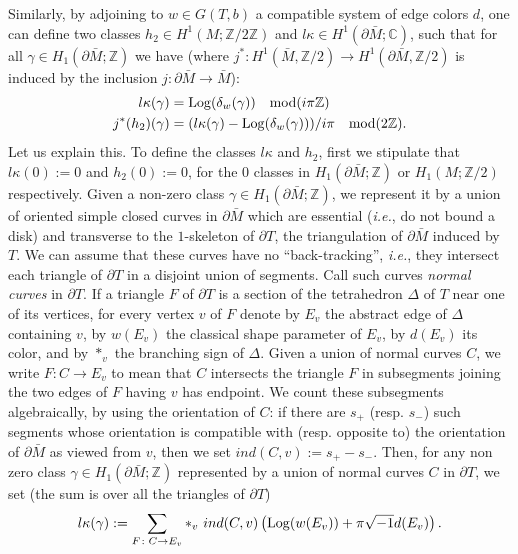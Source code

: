 \documentclass[11pt]{amsart}
\newcommand{\mc}{\mathbb{C}}
\newcommand{\mz}{\mathbb{Z}}
\newcommand{\Z}{\mathbb{Z}}
\newcommand{\Log}{{\rm Log}}
\newcommand{\ra}{\rightarrow}
\begin{document}
Similarly, by adjoining to $w\in G(T,b)$ a compatible system of edge colors $d$, one can define two  classes $h_2\in H^1(M;\mz/2\mz)$ and $l\kappa\in H^1(\partial \bar M; \mc)$, such that for all $\gamma \in H_1(\partial \bar M; \Z)$ we have (where $j^*\colon H^1(\bar{M},\mz/2)\ra H^1(\partial \bar{M},\mz/2)$ is induced by the inclusion $j\colon \partial \bar{M} \ra \bar{M}$):
\begin{align}
l\kappa(\gamma) & = \Log(\delta_{w}(\gamma)) \quad {\rm mod}(i\pi\mz) \label{lkconstraint0}\\
j^*(h_2)(\gamma) & = (l\kappa(\gamma)-\Log(\delta_{w}(\gamma)))/i\pi\quad{\rm mod} (2\mz).\label{h2class}
\end{align}
Let us explain this. To define the classes $l\kappa$ and $h_2$, first we stipulate that $l\kappa(0):=0$ and $h_2(0):=0$, for the $0$ classes in $H_1(\partial \bar M;\mz)$ or $H_1(M;\mz/2)$ respectively. Given a non-zero class $\gamma\in H_1(\partial \bar M;\mz)$, we represent it by a union of oriented simple closed curves in $\partial \bar M$ which are essential ({\it i.e.}, do not bound a disk) and transverse to the $1$-skeleton of $\partial T$, the triangulation of $\partial \bar M$ induced by $T$. We can assume that these curves have no ``back-tracking'', {\it i.e.}, they intersect each triangle of $\partial T$ in a disjoint union of segments. Call such curves {\it normal curves} in $\partial T$. If a triangle $F$ of $\partial T$ is a section of the tetrahedron $\Delta$ of $T$ near one of its vertices, for every vertex $v$ of $F$ denote by $E_v$ the abstract edge of $\Delta$ containing $v$, by $w(E_v)$ the classical shape parameter of $E_v$, by $d(E_v)$ its color, and by $*_v$ the branching sign of $\Delta$. Given a union of normal curves $C$, we write $F\colon C \rightarrow E_v$ to mean that $C$ intersects the triangle $F$ in subsegments joining the two edges of $F$ having $v$ has endpoint. We count these subsegments algebraically, by using the orientation of $C$: if there are $s_+$ (resp. $s_-$) such segments whose orientation is compatible with (resp. opposite to) the orientation of $\partial \bar M$ as viewed from $v$, then we set $ind(C,v) :=s_+-s_-$. Then, for any non zero class $\gamma\in H_1(\partial \bar M;\mz)$ represented by a union of normal curves $C$ in $\partial T$, we set (the sum is over all the triangles of $\partial T$)
\begin{equation}
  l\kappa(\gamma)  := \sum_{F\colon C \ra E_v} *_v \ ind(C,v)\left(\Log(w(E_v)) +\pi \sqrt{-1}d(E_v)\right) \label{formulelkappa}.
  \end{equation}
\end{document}

